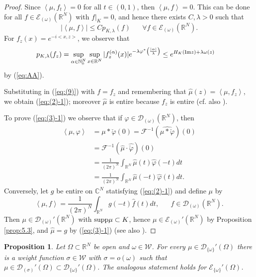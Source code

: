 \documentclass[twoside]{amsart}
\newtheorem{Prop}[Th]{Proposition}
\begin{document}
\begin{proof}
Since $\left\langle \mu,f_{t}\right\rangle =0$ for all $t\in(0,1)$,
then $\left\langle \mu,f\right\rangle =0$. This can be done for all
$f\in{\mathcal{E}}_{(\omega)}({\mathbb R}^N)$ with $\left.f\right|_{K}=0$, and hence there exists 
$C,\lambda>0$
such that
\begin{equation}
  \left|\left\langle \mu,f\right\rangle \right|\leq Cp_{K,\lambda}(f)
  \,\,\,\,\,\,\,\,\,\,\forall f\in{\mathcal{E}}_{(\omega)}({\mathbb R}^N).
  \label{eq:(9)}
\end{equation}
For $f_{z}(x)=e^{-i<x,z>}$, we observe that
\begin{align*}
  p_{K,\lambda} & (f_{z})=\sup_{\alpha\in{\mathbb N}_0^N}\sup_{x\in{\mathbb R}^N}
  |f_{z}^{(\alpha)}(x)|e^{-\lambda\varphi^*\left(\frac{|\alpha|}{\lambda}\right)}\leq
  e^{H_{K}({\mathop{\rm Im}\nolimits} z)+\lambda\omega(z)}
\end{align*}
by (\ref{eq:AA}).

Substituting in (\ref{eq:(9)}) with $f=f_{z}$ and remembering that
$\hat{\mu}(z)=\left\langle \mu,f_{z}\right\rangle $, we obtain (\ref{eq:(2)-1});
moreover $\hat{\mu}$ is entire because $f_{z}$ is entire
(cf. also \cite[Prop.~7.2]{BMT}).

To prove (\ref{eq:(3)-1}) we observe that if $\varphi\in{\mathcal{D}}_{(\omega)}({\mathbb R}^N)$, then
\begin{align*}
  \left\langle \mu,\varphi\right\rangle  & =\mu*\check{\varphi}(0)
  ={\mathcal{F}}^{-1}\left(\widehat{\mu*\check{\varphi}}\right)(0)\\
 & ={\mathcal{F}}^{-1}\left(\hat{\mu}\cdot\hat{\check{\varphi}}\right)(0)\\
 & =\frac{1}{(2\pi)^{N}}\int_{{\mathbb R}^N}\hat{\mu}(t)\hat{\varphi}(-t)dt\\
 & =\frac{1}{(2\pi)^{N}}\int_{{\mathbb R}^N}\hat{\mu}(-t)\hat{\varphi}(t)dt.
\end{align*}
Conversely, let $g$ be entire on $\mathbb{C}^{N}$ statisfying (\ref{eq:(2)-1})
and define $\mu$ by
\[
\left\langle \mu,f\right\rangle =\frac{1}{(2\pi)^{N}}\int_{{\mathbb R}^N}g(-t)
\hat{f}(t)dt,\,\,\,\,\,\,\,\,\,\,f\in{\mathcal{D}}_{(\omega)}({\mathbb R}^N).
\]
Then $\mu\in{\mathcal{D}}_{(\omega)}'({\mathbb R}^N)$ with ${\mathop{\rm supp}\nolimits}\mu\subset K$, hence
$\mu\in{\mathcal{E}}_{(\omega)}'({\mathbb R}^N)$
by Proposition \ref{prop:5.3}, and $\hat{\mu}=g$ by (\ref{eq:(3)-1})
(see also \cite[Prop. 7.3]{BMT}).
\end{proof}

\begin{Prop}
  Let $\Omega\subset{\mathbb R}^N$ be open and $\omega\in{\mathcal{W}}$. For every $\mu\in
  {\mathcal{D}}_{\{\omega\}}'(\Omega)$
there is a weight function $\sigma\in{\mathcal{W}}$ with $\sigma=o(\omega)$
such that $\mu\in{\mathcal{D}}_{(\sigma)}'(\Omega)\subset{\mathcal{D}}_{\{\omega\}}'(\Omega)$.
The analogous statement holds for ${\mathcal{E}}_{\{\omega\}}'(\Omega)$.
\end{Prop}
\end{document}
